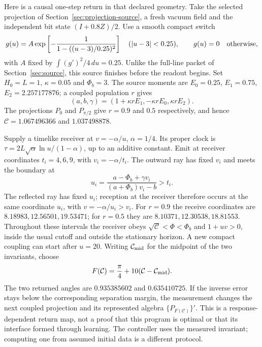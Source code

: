\documentclass[12pt,a4paper]{article}
\begin{document}
Here is a causal one-step return in that declared geometry. Take the selected
projection of Section~\ref{sec:projection-source}, a fresh vacuum field and
the independent bit state $(I+0.8Z)/2$. Use a smooth compact switch
\begin{equation}\label{eq:compact-return-switch}
 g(u)=A\exp\left[-\frac{1}{1-((u-3)/0.25)^2}\right]
 \quad (|u-3|<0.25),\qquad g(u)=0\quad\hbox{otherwise},
\end{equation}
with $A$ fixed by $\int(g')^2/4\,du=0.25$. Unlike the full-line packet of
Section~\ref{sec:source}, this source finishes before the readout begins.
Set $H_0=L=1$, $\kappa=0.05$ and $\Phi_b=3$. The source moments are
$E_0=0.25$, $E_1=0.75$, $E_2=2.257177876$; a coupled population $r$ gives
\[
 (a,b,\gamma)=(1+\kappa rE_1,-\kappa rE_0,\kappa rE_2).
\]
The projections $P_0$ and $P_{\pi/2}$ give $r=0.9$ and $0.5$ respectively,
and hence $\mathcal C=1.067496366$ and $1.037498878$.

Supply a timelike receiver at $v=-\alpha/u$, $\alpha=1/4$. Its proper clock is
$\tau=2L\sqrt\alpha\ln u/(1-\alpha)$, up to an additive constant.
Emit at receiver coordinates $t_i=4,6,9$, with $v_i=-\alpha/t_i$. The outward
ray has fixed $v_i$ and meets the boundary at
\[
 u_i=\frac{a-\Phi_b+\gamma v_i}{(a+\Phi_b)v_i-b}>t_i.
\]
The reflected ray has fixed $u_i$; reception at the receiver therefore occurs
at the same coordinate $u_i$, with $v=-\alpha/u_i>v_i$.
For $r=0.9$ the receive coordinates are $8.18983,12.56501,19.53471$;
for $r=0.5$ they are $8.10371,12.30538,18.81553$. Throughout these intervals
the receiver obeys $\sqrt{\mathcal C}<\Phi<\Phi_b$ and $1+uv>0$, inside the
usual cutoff and outside the stationary horizon. A new compact coupling can
start after $u=20$.
Writing $\mathcal C_{\rm mid}$ for the midpoint of the two invariants, choose
\begin{equation}\label{eq:return-program}
 F(\mathcal C)=\frac\pi4+10(\mathcal C-\mathcal C_{\rm mid}).
\end{equation}
The two returned angles are $0.935385602$ and $0.635410725$. If the inverse
error stays below the corresponding separation margin, the measurement changes
the next coupled projection and its represented algebra $\{P_{F(\mathcal C)}\}'$.
This is a response-dependent return map, not a proof that this program is optimal
or that its interface formed through learning. The controller uses the measured
invariant; computing one from assumed initial data is a different protocol.
\end{document}
